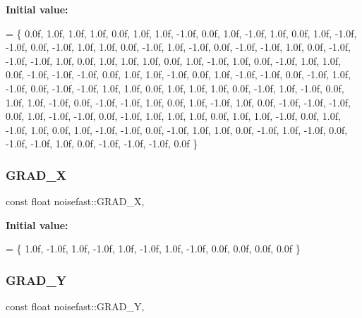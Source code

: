{\bfseries Initial value\+:}
\begin{DoxyCode}
=
\{
    0.0f, 1.0f, 1.0f, 1.0f, 0.0f, 1.0f, 1.0f, -1.0f, 0.0f, 1.0f, -1.0f, 1.0f, 0.0f, 1.0f, -1.0f, -1.0f,
    0.0f, -1.0f, 1.0f, 1.0f, 0.0f, -1.0f, 1.0f, -1.0f, 0.0f, -1.0f, -1.0f, 1.0f, 0.0f, -1.0f, -1.0f, -1.0f,
    1.0f, 0.0f, 1.0f, 1.0f, 1.0f, 0.0f, 1.0f, -1.0f, 1.0f, 0.0f, -1.0f, 1.0f, 1.0f, 0.0f, -1.0f, -1.0f,
    -1.0f, 0.0f, 1.0f, 1.0f, -1.0f, 0.0f, 1.0f, -1.0f, -1.0f, 0.0f, -1.0f, 1.0f, -1.0f, 0.0f, -1.0f, -1.0f,
    1.0f, 1.0f, 0.0f, 1.0f, 1.0f, 1.0f, 0.0f, -1.0f, 1.0f, -1.0f, 0.0f, 1.0f, 1.0f, -1.0f, 0.0f, -1.0f,
    -1.0f, 1.0f, 0.0f, 1.0f, -1.0f, 1.0f, 0.0f, -1.0f, -1.0f, -1.0f, 0.0f, 1.0f, -1.0f, -1.0f, 0.0f, -1.0f,
    1.0f, 1.0f, 1.0f, 0.0f, 1.0f, 1.0f, -1.0f, 0.0f, 1.0f, -1.0f, 1.0f, 0.0f, 1.0f, -1.0f, -1.0f, 0.0f,
    -1.0f, 1.0f, 1.0f, 0.0f, -1.0f, 1.0f, -1.0f, 0.0f, -1.0f, -1.0f, 1.0f, 0.0f, -1.0f, -1.0f, -1.0f, 0.0f
\}
\end{DoxyCode}
\mbox{\label{classnoisefast_ab24f6b26709370851954b246aa9bde7b}} 
\subsubsection{\texorpdfstring{G\+R\+A\+D\+\_\+X}{GRAD\_X}}
{\footnotesize\ttfamily const float noisefast\+::\+G\+R\+A\+D\+\_\+X\hspace{0.3cm}{\ttfamily [static]}, {\ttfamily [private]}}

{\bfseries Initial value\+:}
\begin{DoxyCode}
=
\{
    1.0f, -1.0f, 1.0f, -1.0f,
    1.0f, -1.0f, 1.0f, -1.0f,
    0.0f, 0.0f, 0.0f, 0.0f
\}
\end{DoxyCode}
\mbox{\label{classnoisefast_a30a7f42cf547b44132e8a9a767d74cac}} 
\subsubsection{\texorpdfstring{G\+R\+A\+D\+\_\+Y}{GRAD\_Y}}
{\footnotesize\ttfamily const float noisefast\+::\+G\+R\+A\+D\+\_\+Y\hspace{0.3cm}{\ttfamily [static]}, {\ttfamily [private]}}

